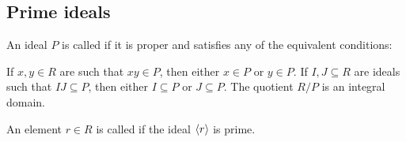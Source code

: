 \subsection{Prime ideals}\label{subsec:prime_ideals}

\begin{definition}\label{def:prime_ring_ideal}\cite[384]{Knapp2016BAlg}
  An ideal \( P \) is called  if it is proper and satisfies any of the equivalent conditions:
  \begin{defenum}
     If \( x, y \in R \) are such that \( xy \in P \), then either \( x \in P \) or \( y \in P \).
     If \( I, J \subseteq R \) are ideals such that \( IJ \subseteq P \), then either \( I \subseteq P \) or \( J \subseteq P \).
     The quotient \( R / P \) is an integral domain.
  \end{defenum}

  An element \( r \in R \) is called  if the ideal \( \left\langle r \right\rangle \) is prime.
\end{definition}
